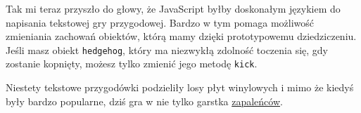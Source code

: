   
Tak mi teraz przyszło do głowy, że JavaScript byłby doskonałym językiem do napisania tekstowej gry przygodowej. Bardzo w tym pomaga możliwość zmieniania zachowań obiektów, którą mamy dzięki prototypowemu dziedziczeniu. Jeśli masz obiekt \texttt{hedgehog}, który ma niezwykłą zdolność toczenia się, gdy zostanie kopnięty, możesz tylko zmienić jego metodę \texttt{kick}.

  
Niestety tekstowe przygodówki podzieliły losy płyt winylowych i mimo że kiedyś były bardzo popularne, dziś gra w nie tylko garstka \href{http://groups.google.com/group/rec.arts.int-fiction/topics}{zapaleńców}.